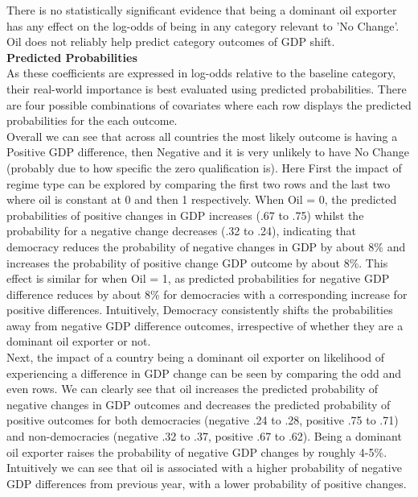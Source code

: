 \documentclass[12pt,letterpaper]{article}
\begin{document}
\begin{enumerate}
		 
		There is no statistically significant evidence that being a dominant oil exporter has any effect on the log-odds of being in any category relevant to 'No Change'.  Oil does not reliably help predict category outcomes of GDP shift.  \\
		
		\textbf{Predicted Probabilities} \\
		As these coefficients are expressed in log-odds relative to the baseline category, their real-world importance is best evaluated using predicted probabilities. There are four possible combinations of covariates where each row displays the predicted probabilities for the each outcome.  \\
		
		Overall we can see that across all countries the most likely outcome is having a Positive GDP difference, then Negative and it is very unlikely to have No Change (probably due to how specific the zero qualification is). 
		Here  
		First the impact of regime type can be explored by comparing the first two rows and the last two where oil is constant at 0 and then 1 respectively. 
		When Oil = 0, the predicted probabilities of positive changes in GDP increases (.67 to .75) whilst the probability for a negative change decreases (.32 to .24), indicating that democracy reduces the probability of negative changes in GDP by about 8\% and increases the probability of positive change GDP outcome by about 8\%. This effect is similar for when Oil = 1, as predicted probabilities for negative GDP difference reduces by about 8\% for democracies with a corresponding increase for positive differences. Intuitively, Democracy consistently shifts the probabilities away from negative GDP difference outcomes, irrespective of whether they are a dominant oil exporter or not. \\
		
		Next, the impact of a country being a dominant oil exporter on likelihood of experiencing a difference in GDP change can be seen by comparing the odd and even rows. We can clearly see that oil increases the predicted probability of negative changes in GDP outcomes and decreases the predicted probability of positive outcomes for both democracies (negative .24 to .28, positive .75 to .71) and non-democracies  (negative .32 to .37, positive .67 to .62). Being a dominant oil exporter raises the probability of negative GDP changes by roughly 4-5\%. Intuitively we can see that oil is associated with a higher probability of negative GDP differences from previous year, with a lower probability of positive changes. 
		

\end{enumerate}
\end{document}
